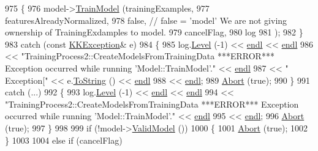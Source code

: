 \begin{DoxyCode}
975   \{
976     model->\hyperlink{class_k_k_m_l_l_1_1_model_a1341c2cdd41a271e4b84ebf25838d389}{TrainModel} (trainingExamples, 
977                        featuresAlreadyNormalized,
978                        \textcolor{keyword}{false},     \textcolor{comment}{// false = 'model' We are not giving ownership of TrainingExdamples to
       model.}
979                        cancelFlag,
980                        log
981                       );
982   \}
983   \textcolor{keywordflow}{catch}  (\textcolor{keyword}{const} \hyperlink{class_k_k_b_1_1_k_k_exception}{KKException}&  e)
984   \{
985     log.\hyperlink{class_k_k_b_1_1_run_log_a32cf761d7f2e747465fd80533fdbb659}{Level} (-1) << \hyperlink{namespace_k_k_b_ad1f50f65af6adc8fa9e6f62d007818a8}{endl} << \hyperlink{namespace_k_k_b_ad1f50f65af6adc8fa9e6f62d007818a8}{endl}
986       << \textcolor{stringliteral}{"TrainingProcess2::CreateModelsFromTrainingData   ***ERROR***   Exception occurred while running
       'Model::TrainModel'."} << \hyperlink{namespace_k_k_b_ad1f50f65af6adc8fa9e6f62d007818a8}{endl}
987       << \textcolor{stringliteral}{"     Exception["} << e.\hyperlink{class_k_k_b_1_1_k_k_exception_a9d565e887e90968c5e306c1ea94c6894}{ToString} () << \hyperlink{namespace_k_k_b_ad1f50f65af6adc8fa9e6f62d007818a8}{endl}
988       << \hyperlink{namespace_k_k_b_ad1f50f65af6adc8fa9e6f62d007818a8}{endl};
989     \hyperlink{class_k_k_m_l_l_1_1_training_process2_a5e5fad4ad447c8fdb38ab59da4c17aff}{Abort} (\textcolor{keyword}{true});
990   \}
991   \textcolor{keywordflow}{catch}  (...)
992   \{
993     log.\hyperlink{class_k_k_b_1_1_run_log_a32cf761d7f2e747465fd80533fdbb659}{Level} (-1) << \hyperlink{namespace_k_k_b_ad1f50f65af6adc8fa9e6f62d007818a8}{endl} << \hyperlink{namespace_k_k_b_ad1f50f65af6adc8fa9e6f62d007818a8}{endl}
994       << \textcolor{stringliteral}{"TrainingProcess2::CreateModelsFromTrainingData   ***ERROR***   Exception occurred while running
       'Model::TrainModel'."} << \hyperlink{namespace_k_k_b_ad1f50f65af6adc8fa9e6f62d007818a8}{endl}
995       << \hyperlink{namespace_k_k_b_ad1f50f65af6adc8fa9e6f62d007818a8}{endl};
996     \hyperlink{class_k_k_m_l_l_1_1_training_process2_a5e5fad4ad447c8fdb38ab59da4c17aff}{Abort} (\textcolor{keyword}{true});
997   \}
998 
999   \textcolor{keywordflow}{if}  (!model->\hyperlink{class_k_k_m_l_l_1_1_model_aa9a1e4855c20e37b5245facd13276688}{ValidModel} ())
1000   \{
1001     \hyperlink{class_k_k_m_l_l_1_1_training_process2_a5e5fad4ad447c8fdb38ab59da4c17aff}{Abort} (\textcolor{keyword}{true});
1002   \}
1003 
1004   \textcolor{keywordflow}{else} \textcolor{keywordflow}{if}  (cancelFlag)

\end{DoxyCode}
